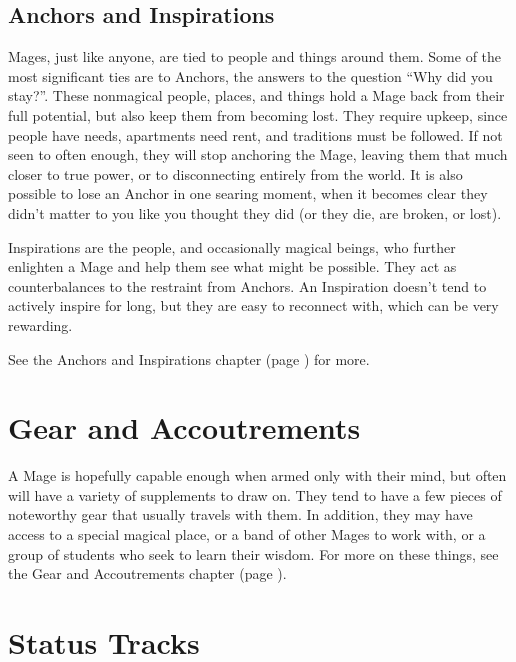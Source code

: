 \documentclass[10pt,twoside,openright]{memoir}
\begin{document}
\hypertarget{anchors-and-inspirations}{%
\subsection{Anchors and Inspirations}\label{anchors-and-inspirations}}

Mages, just like anyone, are tied to people and things around them. Some
of the most significant ties are to Anchors, the answers to the question
``Why did you stay?''. These nonmagical people, places, and things hold
a Mage back from their full potential, but also keep them from becoming
lost. They require upkeep, since people have needs, apartments need
rent, and traditions must be followed. If not seen to often enough, they
will stop anchoring the Mage, leaving them that much closer to true
power, or to disconnecting entirely from the world. It is also possible
to lose an Anchor in one searing moment, when it becomes clear they
didn't matter to you like you thought they did (or they die, are broken,
or lost).

Inspirations are the people, and occasionally magical beings, who
further enlighten a Mage and help them see what might be possible. They
act as counterbalances to the restraint from Anchors. An Inspiration
doesn't tend to actively inspire for long, but they are easy to
reconnect with, which can be very rewarding.

See the Anchors and Inspirations chapter (page \pageref{Anchors and Inspirations chapter}) for more.

\hypertarget{gear-and-accoutrements}{%
\section{Gear and Accoutrements}\label{gear-and-accoutrements}}

A Mage is hopefully capable enough when armed only with their mind, but often will have a variety of supplements to draw on. They tend to have a few pieces of noteworthy gear that usually travels with them. In addition, they may have access to a special magical place, or a band of other Mages to work with, or a group of students who seek to learn their wisdom. For more on these things, see the Gear and Accoutrements chapter (page \pageref{Gear and Accoutrements chapter}).

\hypertarget{status-tracks}{%
\section{Status Tracks}\label{status-tracks}}
\end{document}
